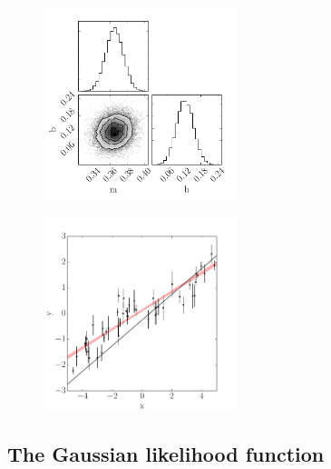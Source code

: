 \documentclass[12pt,preprint]{aastex}
\newcommand{\figlabel}[1]{\label{fig:#1}}
\begin{document}
\begin{figure}[htbp]
\begin{center}
\includegraphics[width=0.5\textwidth]{figures/line_lls_triangle.pdf}
\end{center}
\caption{%
\figlabel{line-lls-triangle}}
\end{figure}

\begin{figure}[htbp]
\begin{center}
\includegraphics[width=0.5\textwidth]{figures/line_lls.pdf}
\end{center}
\caption{%
\figlabel{line-lls}}
\end{figure}

\subsection{The Gaussian likelihood function}
\end{document}
